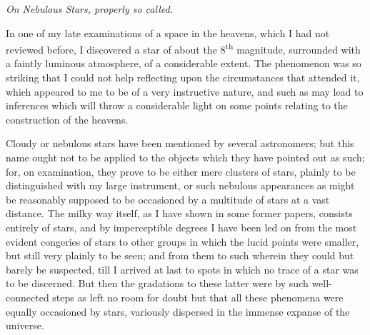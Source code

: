 \documentclass[a4paper, 12pt, oneside, polutonikogreek, english]{article}
\begin{document}
\emph{On Nebulous Stars, properly so called.}

In one of my late examinations of a space in the heavens, which I had not reviewed before, I discovered a star of about the 8\textsuperscript{th} magnitude, surrounded with a faintly luminous atmosphere, of a considerable extent. The phenomenon was so striking that I could not help reflecting upon the circumstances that attended it, which appeared to me to be of a very instructive nature, and such as may lead to inferences which will throw a considerable light on some points relating to the construction of the heavens.

Cloudy or nebulous stars have been mentioned by several astronomers; but this name ought not to be applied to the objects which they have pointed out as such; for, on examination, they prove to be either mere clusters of stars, plainly to be distinguished with my large instrument, or such nebulous appearances as might be reasonably supposed to be occasioned by a multitude of stars at a vast distance. The milky way itself, as I have shown in some former papers, consists entirely of stars, and by imperceptible degrees I have been led on from the most evident congeries of stars to other groups in which the lucid points were smaller, but still very plainly to be seen; and from them to such wherein they could but barely be suspected, till I arrived at last to spots in which no trace of a star was to be discerned. But then the gradations to these latter were by such well-connected steps as left no room for doubt but that all these phenomena were equally occasioned by stars, variously dispersed in the immense expanse of the universe.
\end{document}
